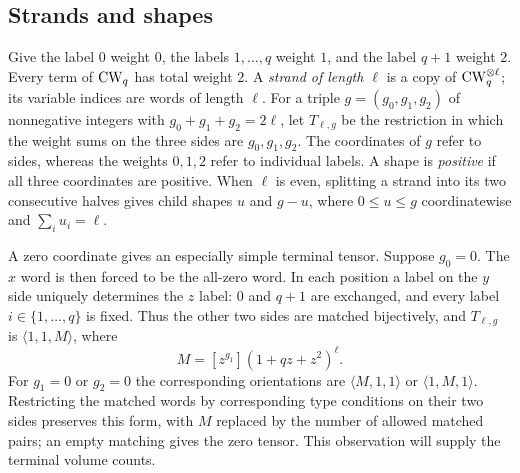 \subsection{Strands and shapes}

Give the label $0$ weight $0$, the labels $1,\ldots,q$ weight $1$,
and the label $q+1$ weight $2$.  Every term of $\mathrm{CW}_q$ has total
weight $2$.  A \emph{strand of length $\ell$} is a copy of
$\mathrm{CW}_q^{\otimes\ell}$; its variable indices are words of length
$\ell$.  For a triple $g=(g_0,g_1,g_2)$ of nonnegative integers
with $g_0+g_1+g_2=2\ell$, let $T_{\ell,g}$ be the restriction in
which the weight sums on the three sides are $g_0,g_1,g_2$.
The coordinates of $g$ refer to sides, whereas the weights $0,1,2$
refer to individual labels.  A shape is \emph{positive} if all three
coordinates are positive.  When $\ell$ is even, splitting a strand
into its two consecutive halves gives child shapes $u$ and $g-u$,
where $0\leq u\leq g$ coordinatewise and $\sum_i u_i=\ell$.

A zero coordinate gives an especially simple terminal tensor.
Suppose $g_0=0$.  The $x$ word is then forced to be the all-zero
word.  In each position a label on the $y$ side uniquely determines
the $z$ label: $0$ and $q+1$ are exchanged, and every label
$i\in\{1,\ldots,q\}$ is fixed.  Thus the other two sides are
matched bijectively, and $T_{\ell,g}$ is
$\langle1,1,M\rangle$, where
\[
 M=[z^{g_1}](1+qz+z^2)^\ell.
\]
For $g_1=0$ or $g_2=0$ the corresponding orientations are
$\langle M,1,1\rangle$ or $\langle1,M,1\rangle$.  Restricting
the matched words by corresponding type conditions on their two
sides preserves this form, with $M$ replaced by the number of
allowed matched pairs; an empty matching gives the zero tensor.
This observation will supply the terminal volume counts.
